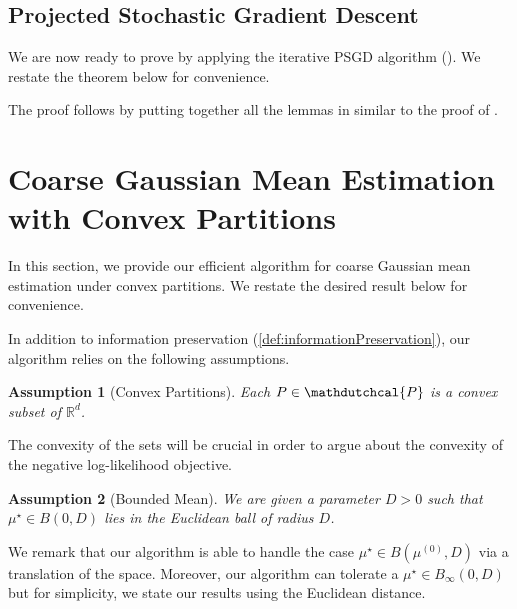 \documentclass[11pt,letterpaper]{article}
\theoremstyle{plain}
\newtheorem{assumption}{Assumption}
\theoremstyle{definition}
\theoremstyle{remark}
\newcommand{\R}{\mathbb{R}}
\newcommand{\hypo}[1]{\mathdutchcal{#1}}
\newcommand{\hyP}{\hypo{P}}
\newcommand{\muStar}{{\mu^\star}}
\begin{document}
{{        

    
\subsection{Projected Stochastic Gradient Descent}
    We are now ready to prove  by applying the iterative PSGD algorithm ().
    We restate the theorem below for convenience.
    \thmSecondPriceLocalConvergence*

        \noindent The proof follows by putting together all the lemmas in  similar to the proof of .





\section{Coarse Gaussian Mean Estimation with Convex Partitions}
\label{sec:coarseGaussianEstimation}
In this section, we provide our efficient algorithm for coarse Gaussian mean estimation under convex partitions.
We restate the desired result below for convenience.
\thmConvexPartitionMeanEstimation*

    In addition to information preservation (\cref{def:informationPreservation}), our algorithm relies on the following assumptions.
    \begin{assumption}[Convex Partitions]\label{asmp:convexPartitions}
        Each $P\in \hyP$ is a convex subset of $\R^d$.
    \end{assumption}
    The convexity of the sets will be crucial in order to argue about the convexity of the negative log-likelihood objective.
    \begin{assumption}[Bounded Mean]\label{asmp:boundedMean}
        We are given a parameter $D > 0$ such that $\muStar\in B(0, D)$ lies in the Euclidean ball of radius $D$.
    \end{assumption}
    We remark that our algorithm is able to handle the case $\muStar\in B(\mu^{(0)}, D)$ via a translation of the space.
    Moreover,
    our algorithm can tolerate a $\muStar\in B_\infty(0, D)$ but for simplicity,
    we state our results using the Euclidean distance.
    

}}
\end{document}

